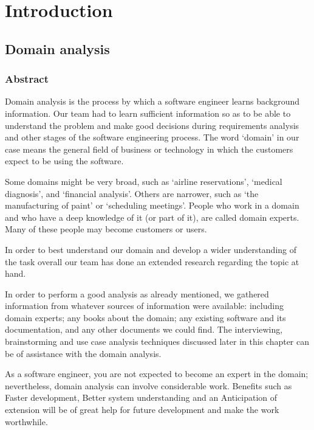 	\section{Introduction}

\subsection{Domain analysis}
\subsubsection{Abstract}
\par Domain analysis is the process by which a software engineer learns background information. Our team had to learn sufficient information so as to be able to understand the problem and make good decisions during requirements analysis and other stages of the software engineering process. The word ‘domain’ in our case means the general field of business or technology in which the customers expect to be using the software. 

Some domains might be very broad, such as ‘airline reservations’, ‘medical diagnosis’, and ‘financial analysis’. Others are narrower, such as ‘the manufacturing of paint’ or ‘scheduling meetings’. People who work in a domain and who have a deep knowledge of it (or part of it), are called domain experts. Many of these people may become customers or users. 

In order to best understand our domain and develop a wider understanding of the task overall our team has done an extended research regarding the topic at hand. 

In order to perform a good analysis as already mentioned, we gathered information from whatever sources of information were available: including domain experts; any books about the domain; any existing software and its documentation, and any other documents we could find. The interviewing, brainstorming and use case analysis techniques discussed later in this chapter can be of assistance with the domain analysis.  

As a software engineer, you are not expected to become an expert in the domain; nevertheless, domain analysis can involve considerable work. Benefits such as Faster development, Better system understanding and an Anticipation of extension will be of great help for future development and make the work worthwhile. 
